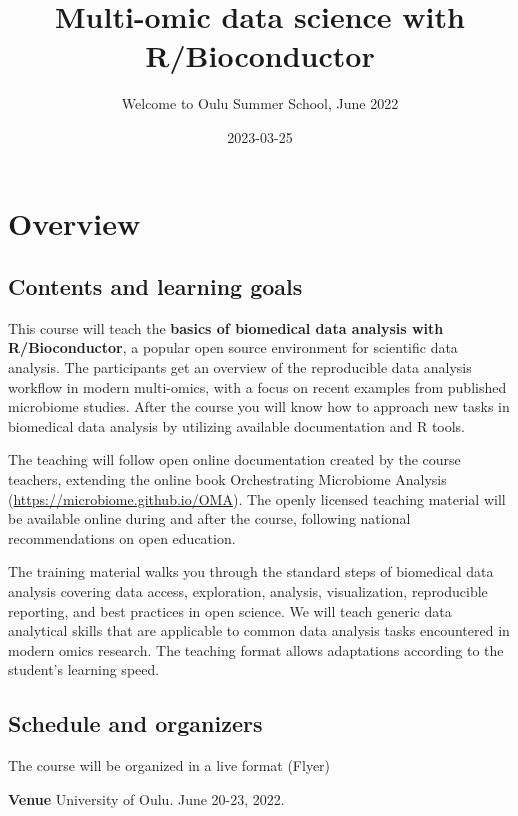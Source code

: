\documentclass[
  oneside]{book}
\title{Multi-omic data science with R/Bioconductor}
\subtitle{Welcome to Oulu Summer School, June 2022}
\author{}
\date{\vspace{-2.5em}2023-03-25}
\begin{document}
\maketitle

{
\setcounter{tocdepth}{1}
\tableofcontents
}
\hypertarget{overview}{%
\chapter{Overview}\label{overview}}

\hypertarget{contents-and-learning-goals}{%
\section{Contents and learning goals}\label{contents-and-learning-goals}}

This course will teach the \textbf{basics of biomedical data analysis with
R/Bioconductor}, a popular open source environment for scientific
data analysis. The participants get an overview of the reproducible
data analysis workflow in modern multi-omics, with a focus on recent
examples from published microbiome studies. After the course you will
know how to approach new tasks in biomedical data analysis by
utilizing available documentation and R tools.

The teaching will follow open online documentation created by the
course teachers, extending the online book Orchestrating Microbiome
Analysis (\url{https://microbiome.github.io/OMA}). The openly licensed
teaching material will be available online during and after the
course, following national recommendations on open education.

The training material walks you through the standard steps of
biomedical data analysis covering data access, exploration, analysis,
visualization, reproducible reporting, and best practices in open
science. We will teach generic data analytical skills that are
applicable to common data analysis tasks encountered in modern omics
research. The teaching format allows adaptations according to the
student's learning speed.

\hypertarget{schedule-and-organizers}{%
\section{Schedule and organizers}\label{schedule-and-organizers}}

The course will be organized in a live format (Flyer)

\textbf{Venue} University of Oulu. June 20-23, 2022.
\end{document}
